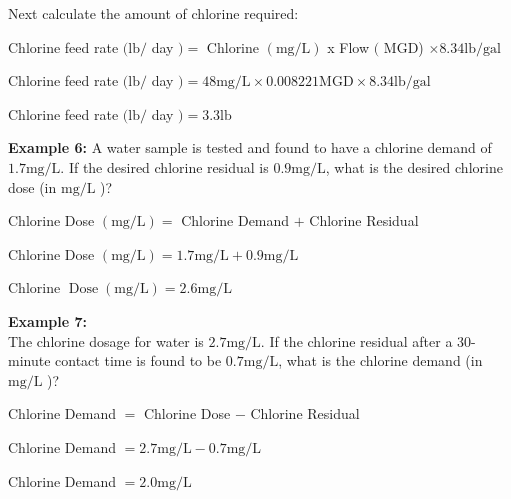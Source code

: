 Next calculate the amount of chlorine required:

Chlorine feed rate $(\mathrm{lb} /$ day $)=$ Chlorine $(\mathrm{mg} / \mathrm{L})$ x Flow $($ MGD) $\times 8.34 \mathrm{lb} / \mathrm{gal}$

Chlorine feed rate $(\mathrm{lb} /$ day $)=48 \mathrm{mg} / \mathrm{L} \times 0.008221 \mathrm{MGD} \times 8.34 \mathrm{lb} / \mathrm{gal}$

Chlorine feed rate $(\mathrm{lb} /$ day $)=3.3 \mathrm{lb}$

\textbf{Example 6:} A water sample is tested and found to have a chlorine demand of $1.7 \mathrm{mg} / \mathrm{L}$. If the desired chlorine residual is $0.9 \mathrm{mg} / \mathrm{L}$, what is the desired chlorine dose (in $\mathrm{mg} / \mathrm{L}$ )?

Chlorine Dose $(\mathrm{mg} / \mathrm{L})=$ Chlorine Demand $+$ Chlorine Residual

Chlorine Dose $(\mathrm{mg} / \mathrm{L})=1.7 \mathrm{mg} / \mathrm{L}+0.9 \mathrm{mg} / \mathrm{L}$

Chlorine $\operatorname{Dose}(\mathrm{mg} / \mathrm{L})=2.6 \mathrm{mg} / \mathrm{L}$

\textbf{Example 7:}\\
The chlorine dosage for water is $2.7 \mathrm{mg} / \mathrm{L}$. If the chlorine residual after a 30-minute contact time is found to be $0.7 \mathrm{mg} / \mathrm{L}$, what is the chlorine demand (in $\mathrm{mg} / \mathrm{L}$ )?

Chlorine Demand $=$ Chlorine Dose $-$ Chlorine Residual

Chlorine Demand $=2.7 \mathrm{mg} / \mathrm{L}-0.7 \mathrm{mg} / \mathrm{L}$

Chlorine Demand $=2.0 \mathrm{mg} / \mathrm{L}$

